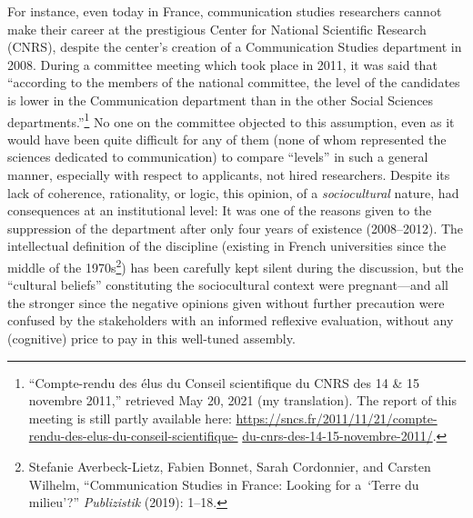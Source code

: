 \documentclass{tufte-handout}
\begin{document}
For instance, even today in France, communication studies researchers
cannot make their career at the prestigious Center for National
Scientific Research (CNRS), despite the center's creation of a
Communication Studies department in 2008. During a committee meeting
which took place in 2011, it was said that ``according to the members of
the national committee, the level of the candidates is lower in the
Communication department than in the other Social Sciences
departments.''\footnote{``Compte-rendu des élus du Conseil scientifique
  du CNRS des 14 \& 15 novembre 2011,'' retrieved May 20, 2021 (my
  translation). The report of this meeting is still partly available
  here:
  \href{https://sncs.fr/2011/11/21/compte-rendu-des-elus-du-conseil-scientifique-du-cnrs-des-14-15-novembre-2011/}{https://sncs.fr/2011/11/21/compte-rendu-des-elus-du-conseil-scientifique-} \href{https://sncs.fr/2011/11/21/compte-rendu-des-elus-du-conseil-scientifique-du-cnrs-des-14-15-novembre-2011/}{du-cnrs-des-14-15-novembre-2011/}.}
No one on the committee objected to this assumption, even as it would
have been quite difficult for any of them (none of whom represented the
sciences dedicated to communication) to compare ``levels'' in such a
general manner, especially with respect to applicants, not hired
researchers. Despite its lack of coherence, rationality, or logic, this
opinion, of a \emph{sociocultural} nature, had consequences at an
institutional level: It was one of the reasons given to the suppression
of the department after only four years of existence (2008--2012). The
intellectual definition of the discipline (existing in French
universities since the middle of the 1970s\footnote{Stefanie
  Averbeck-Lietz, Fabien Bonnet, Sarah Cordonnier, and Carsten Wilhelm,
  ``Communication Studies in France: Looking for a~`Terre du milieu'?''
  \emph{Publizistik} (2019): 1--18.}) has been carefully kept silent
during the discussion, but the ``cultural beliefs'' constituting the
sociocultural context were pregnant---and all the stronger since the
negative opinions given without further precaution were confused by the
stakeholders with an informed reflexive evaluation, without any
(cognitive) price to pay in this well-tuned assembly.
\end{document}

